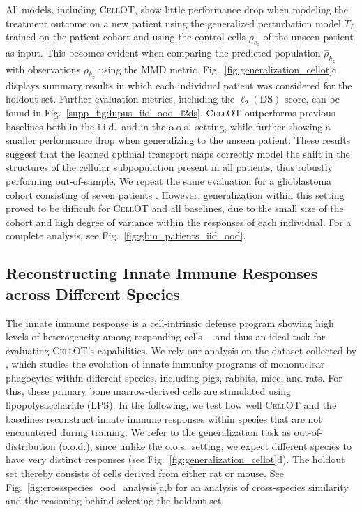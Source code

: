  All models, including \textsc{CellOT}, show little performance drop when modeling the treatment outcome on a new patient using the generalized perturbation model $T_L$ trained on the patient cohort and using the control cells $\rho_{c_z}$ of the unseen patient as input.
This becomes evident when comparing the predicted population $\hat{\rho}_{k_z}$ with observations $\rho_{k_z}$ using the MMD metric. Fig.~\ref{fig:generalization_cellot}c displays summary results in which each individual patient was considered for the holdout set. Further evaluation metrics, including the $\ell_2(\text{DS})$ score, can be found in Fig.~\ref{supp_fig:lupus_iid_ood_l2ds}. \textsc{CellOT} outperforms previous baselines both in the i.i.d.~and in the o.o.s.~setting, while further showing a smaller performance drop when generalizing to the unseen patient.
These results suggest that the learned optimal transport maps correctly model the shift in the structures of the cellular subpopulation present in all patients, thus robustly performing out-of-sample.
We repeat the same evaluation for a glioblastoma cohort consisting of seven patients \citep{zhao2021deconvolution}. However, generalization within this setting proved to be difficult for \textsc{CellOT} and all baselines, due to the small size of the cohort and high degree of variance within the responses of each individual. 
For a complete analysis, see Fig.~\ref{fig:gbm_patients_iid_ood}.

\subsection{Reconstructing Innate Immune Responses across Different Species}

The innate immune response is a cell-intrinsic defense program showing high levels of heterogeneity among responding cells ---and thus an ideal task for evaluating \textsc{CellOT}'s capabilities. We rely our analysis on the dataset collected by \citet{hagai2018gene}, which studies the evolution of innate immunity programs of mononuclear phagocytes within different species, including pigs, rabbits, mice, and rats. For this, these primary bone marrow-derived cells are stimulated using lipopolysaccharide (LPS).
In the following, we test how well \textsc{CellOT} and the baselines reconstruct innate immune responses within species that are not encountered during training. We refer to the generalization task as out-of-distribution (o.o.d.), since unlike the o.o.s.~setting, we expect different species to have very distinct responses (see Fig.~\ref{fig:generalization_cellot}d).
The holdout set thereby consists of cells derived from either rat or mouse. See Fig.~\ref{fig:crossspecies_ood_analysis}a,b for an analysis of cross-species similarity and the reasoning behind selecting the holdout set.

